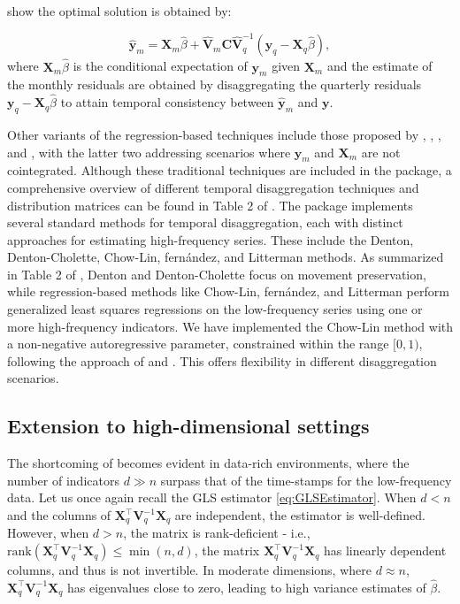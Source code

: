 \citet{chow1971best} show the optimal solution is obtained by:

\begin{equation}
\hat{\mathbf{y}}_m=\mathbf{X}_m\hat{\beta}+\hat{\mathbf{V}}_m\mathbf{C}\hat{\mathbf{V}}_q^{-1}\left(\mathbf{y}_q-\mathbf{X}_q\hat{\beta}\right),
\end{equation}
where \(\mathbf{X}_m\hat{\beta}\) is the conditional expectation of \(\mathbf{y}_m\) given \(\mathbf{X}_m\) and the estimate of the monthly residuals are obtained by disaggregating the quarterly residuals \(\mathbf{y}_q-\mathbf{X}_q\hat{\beta}\) to attain temporal consistency between \(\hat{\mathbf{y}}_m\) and \(\mathbf{y}\).

Other variants of the regression-based techniques include those proposed by \citet{denton1971adjustment}, \citet{fernandez1981methodological}, \citet{litterman1983random}, and \citet{cholette1984adjusting}, with the latter two addressing scenarios where \(\mathbf{y}_m\) and \(\mathbf{X}_m\) are not cointegrated. Although these traditional techniques are included in the  package, a comprehensive overview of different temporal disaggregation techniques and distribution matrices can be found in Table 2 of \citet{sax2013temporal2}. The  package implements several standard methods for temporal disaggregation, each with distinct approaches for estimating high-frequency series. These include the Denton, Denton-Cholette, Chow-Lin, fernández, and Litterman methods. As summarized in Table 2 of \citet{sax2013temporal2}, Denton and Denton-Cholette focus on movement preservation, while regression-based methods like Chow-Lin, fernández, and Litterman perform generalized least squares regressions on the low-frequency series using one or more high-frequency indicators. We have implemented the Chow-Lin method with a non-negative autoregressive parameter, constrained within the range \([0, 1)\), following the approach of \citet{bournay1979reflexions} and \citet{cottrell2023gretl}. This offers flexibility in different disaggregation scenarios.

\hypertarget{extension-to-high-dimensional-settings}{%
\subsection{Extension to high-dimensional settings}\label{extension-to-high-dimensional-settings}}

The shortcoming of \citet{chow1971best} becomes evident in data-rich environments, where the number of indicators \(d\gg n\) surpass that of the time-stamps for the low-frequency data. Let us once again recall the GLS estimator \eqref{eq:GLSEstimator}. When \(d<n\) and the columns of \(\mathbf{X}_q^{\top}\mathbf{V}_q^{-1}\mathbf{X}_q\) are independent, the estimator is well-defined. However, when \(d>n\), the matrix is rank-deficient - i.e., \(\text{rank}(\mathbf{X}_q^{\top}\mathbf{V}_q^{-1}\mathbf{X}_q)\leq \min(n,d)\), the matrix \(\mathbf{X}_q^{\top}\mathbf{V}_q^{-1}\mathbf{X}_q\) has linearly dependent columns, and thus is not invertible. In moderate dimensions, where \(d\approx n\), \(\mathbf{X}_q^{\top}\mathbf{V}_q^{-1}\mathbf{X}_q\) has eigenvalues close to zero, leading to high variance estimates of \(\hat{\beta}\).


